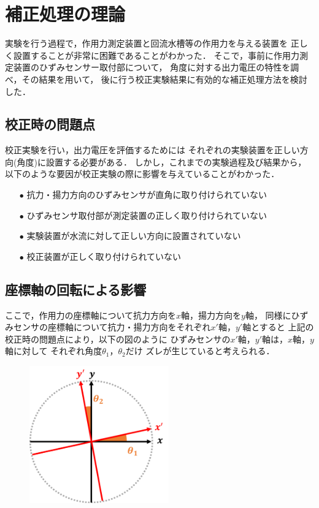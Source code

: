 \documentclass[twocolumn,a4j]{jsarticle}
\begin{document}
\section{補正処理の理論}
実験を行う過程で，作用力測定装置と回流水槽等の作用力を与える装置を
正しく設置することが非常に困難であることがわかった．
そこで，事前に作用力測定装置のひずみセンサー取付部について，
角度に対する出力電圧の特性を調べ，その結果を用いて，
後に行う校正実験結果に有効的な補正処理方法を検討した．\\

\subsection{校正時の問題点}
校正実験を行い，出力電圧を評価するためには
それぞれの実験装置を正しい方向(角度)に設置する必要がある．
しかし，これまでの実験過程及び結果から，
以下のような要因が校正実験の際に影響を与えていることがわかった．

\begin{itemize}
    \item [$\bullet$] 抗力・揚力方向のひずみセンサが直角に取り付けられていない
    \item [$\bullet$] ひずみセンサ取付部が測定装置の正しく取り付けられていない
    \item [$\bullet$] 実験装置が水流に対して正しい方向に設置されていない
    \item [$\bullet$] 校正装置が正しく取り付けられていない
\end{itemize}

\subsection{座標軸の回転による影響}
ここで，作用力の座標軸について抗力方向を$x軸$，揚力方向を$y$軸，
同様にひずみセンサの座標軸について抗力・揚力方向をそれぞれ$x'$軸，$y'$軸とすると
上記の校正時の問題点により，以下の図のように
ひずみセンサの$x'$軸，$y'$軸は，$x$軸，$y$軸に対して
それぞれ角度$\theta_1$，$\theta_2$だけ
ズレが生じていると考えられる．\\

\begin{figure}[htbp]
    \footnotesize
    \begin{center}
        \includegraphics[width=60mm]{../images/image_1.png}
        \caption{}
    \end{center}
\end{figure}
\end{document}
